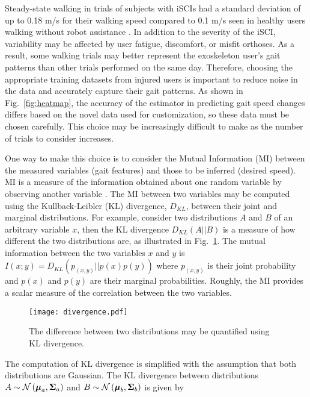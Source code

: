Steady-state walking in trials of subjects with iSCIs had a standard deviation of up to 0.18 m/s for their walking speed compared to 0.1 m/s seen in healthy users walking without robot assistance \cite{socie2013gait}. In addition to the severity of the iSCI, variability may be affected by user fatigue, discomfort, or misfit orthoses. As a result, some walking trials may better represent the exoskeleton user's gait patterns than other trials performed on the same day. Therefore, choosing the appropriate training datasets from injured users is important to reduce noise in the data and accurately capture their gait patterns. As shown in Fig.~\ref{fig:heatmap}, the accuracy of the estimator in predicting gait speed changes differs based on the novel data used for customization, so these data must be chosen carefully. This choice may be increasingly difficult to make as the number of trials to consider increases. 

One way to make this choice is to consider the Mutual Information (MI) between the measured variables (gait features) and those to be inferred (desired speed). MI is a measure of the information obtained about one random variable by observing another variable \cite{cover1999elements}. The MI between two variables may be computed using the Kullback-Leibler (KL) divergence, $ D_{KL} $, between their joint and marginal distributions. For example, consider two distributions $ A $ and $ B $ of an arbitrary variable $ x $, then the KL divergence $ D_{KL}(A||B) $ is a measure of how different the two distributions are, as illustrated in Fig.~\ref{fig:divergence}. The mutual information between the two variables $ x $ and $ y $ is $ I(x;y) = D_{KL}(p_{(x,y)}||p(x)p(y)) $ where $ p_{(x,y)} $ is their joint probability and $ p(x) $ and $ p(y) $ are their marginal probabilities. Roughly, the MI provides a scalar measure of the correlation between the two variables.
%
\begin{figure}
	\centering
	\texttt{[image: divergence.pdf]}
	\caption{The difference between two distributions may be quantified using KL divergence.}\label{fig:divergence}
\end{figure}

The computation of KL divergence is simplified with the assumption that both distributions are Gaussian. The KL divergence between distributions $ A \sim \mathcal{N}\left(\boldsymbol{\mu}_a, \boldsymbol{\Sigma}_a\right) $ and $ B \sim \mathcal{N}\left(\boldsymbol{\mu}_b, \boldsymbol{\Sigma}_b\right) $ is given by

